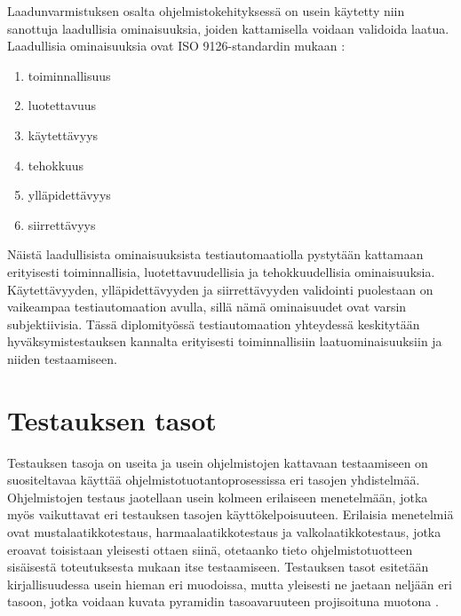   Laadunvarmistuksen osalta ohjelmistokehityksessä on usein käytetty niin sanottuja laadullisia ominaisuuksia, joiden kattamisella voidaan validoida laatua.
  Laadullisia ominaisuuksia ovat ISO 9126-standardin mukaan \cite{iso_quality_attributes}:

  \begin{enumerate}
    \item toiminnallisuus
    \item luotettavuus
    \item käytettävyys
    \item tehokkuus
    \item ylläpidettävyys
    \item siirrettävyys
  \end{enumerate}

  Näistä laadullisista ominaisuuksista testiautomaatiolla pystytään kattamaan erityisesti toiminnallisia, luotettavuudellisia ja tehokkuudellisia ominaisuuksia.
  Käytettävyyden, ylläpidettävyyden ja siirrettävyyden validointi puolestaan on vaikeampaa testiautomaation avulla, sillä nämä ominaisuudet ovat varsin subjektiivisia.
  Tässä diplomityössä testiautomaation yhteydessä keskitytään hyväksymistestauksen kannalta erityisesti toiminnallisiin laatuominaisuuksiin ja niiden testaamiseen.

\section{Testauksen tasot} \label{ch:07_testauksen_tasot}

  Testauksen tasoja on useita ja usein ohjelmistojen kattavaan testaamiseen on suositeltavaa käyttää ohjelmistotuotantoprosessissa eri tasojen yhdistelmää.
  Ohjelmistojen testaus jaotellaan usein kolmeen erilaiseen menetelmään, jotka myös vaikuttavat eri testauksen tasojen käyttökelpoisuuteen.
  Erilaisia menetelmiä ovat mustalaatikkotestaus, harmaalaatikkotestaus ja valkolaatikkotestaus, jotka eroavat toisistaan yleisesti ottaen siinä, otetaanko tieto ohjelmistotuotteen sisäisestä toteutuksesta mukaan itse testaamiseen.
  Testauksen tasot esitetään kirjallisuudessa usein hieman eri muodoissa, mutta yleisesti ne jaetaan neljään eri tasoon, jotka voidaan kuvata pyramidin tasoavaruuteen projisoituna muotona \cite[s.~277]{agile_testing_book} \cite[s.~16]{software_testing_and_qa_book} \cite[s.~369]{software_testing_book}.

